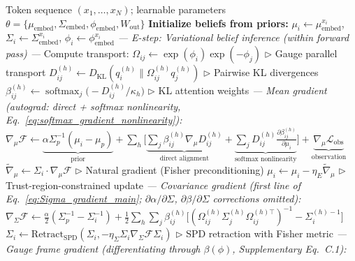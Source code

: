 \documentclass[twoside,11pt]{article}
\newcommand{\softmax}{\operatorname{softmax}}
\newcommand{\KL}{\operatorname{KL}}
\begin{document}
\begin{algorithm}[t]
\caption{GL($K$) Gauge Transformer Training Loop}
\label{alg:em_loop}
\begin{algorithmic}[1]
\REQUIRE Token sequence $(x_1, \ldots, x_N)$; learnable parameters $\theta = \{\mu_{\text{embed}}, \Sigma_{\text{embed}}, \phi_{\text{embed}}, W_{\text{out}}\}$
\STATE \textbf{Initialize beliefs from priors:} $\mu_i \leftarrow \mu_{\text{embed}}^{x_i}$, $\Sigma_i \leftarrow \Sigma_{\text{embed}}^{x_i}$, $\phi_i \leftarrow \phi_{\text{embed}}^{x_i}$
\STATE
\STATE \textit{--- E-step: Variational belief inference (within forward pass) ---}
  \STATE Compute transport: $\Omega_{ij} \leftarrow \exp(\phi_i)\exp(-\phi_j)$ \hfill $\triangleright$ Gauge parallel transport
  \STATE $D_{ij}^{(h)} \leftarrow D_{\KL}(q_i^{(h)} \| \Omega_{ij}^{(h)} q_j^{(h)})$ \hfill $\triangleright$ Pairwise KL divergences
  \STATE $\beta_{ij}^{(h)} \leftarrow \softmax_j \Big(-D_{ij}^{(h)} / \kappa_h\Big)$ \hfill $\triangleright$ KL attention weights
  \ENDFOR
  \STATE \textit{--- Mean gradient (autograd: direct + softmax nonlinearity, Eq.~\ref{eq:softmax_gradient_nonlinearity}):}
  \STATE $\nabla_{\mu} \mathcal{F} \leftarrow \underbrace{\alpha \Sigma_p^{-1}(\mu_i - \mu_p)}_{\text{prior}}
  + \sum_h \Big[\underbrace{\sum_j \beta_{ij}^{(h)} \nabla_\mu D_{ij}^{(h)}}_{\text{direct alignment}}
  + \underbrace{\sum_j D_{ij}^{(h)} \frac{\partial \beta_{ij}^{(h)}}{\partial \mu_i}}_{\text{softmax nonlinearity}}\Big]
  + \underbrace{\nabla_\mu \mathcal{L}_{\text{obs}}}_{\text{observation}}$
  \STATE $\tilde{\nabla}_\mu \leftarrow \Sigma_i \cdot \nabla_\mu \mathcal{F}$ \hfill $\triangleright$ Natural gradient (Fisher preconditioning)
  \STATE $\mu_i \leftarrow \mu_i - \eta_E \tilde{\nabla}_\mu$ \hfill $\triangleright$ Trust-region-constrained update
  \STATE \textit{--- Covariance gradient (first line of Eq.~\ref{eq:Sigma_gradient_main}; $\partial\alpha/\partial\Sigma$, $\partial\beta/\partial\Sigma$ corrections omitted):}
  \STATE $\nabla_{\Sigma} \mathcal{F} \leftarrow \tfrac{\alpha}{2}(\Sigma_p^{-1} - \Sigma_i^{-1})
  + \tfrac{1}{2}\sum_h \sum_j \beta_{ij}^{(h)} \big[(\Omega_{ij}^{(h)}\Sigma_j^{(h)}\Omega_{ij}^{(h)\top})^{-1} - \Sigma_i^{(h)-1}\big]$
  \STATE $\Sigma_i \leftarrow \mathrm{Retract}_{\mathrm{SPD}}(\Sigma_i, -\eta_\Sigma \Sigma_i \nabla_\Sigma\mathcal{F} \Sigma_i)$ \hfill $\triangleright$ SPD retraction with Fisher metric
  \STATE \textit{--- Gauge frame gradient (differentiating through $\beta(\phi)$, Supplementary Eq.~C.1):}

\end{algorithmic}
\end{algorithm}
\end{document}
